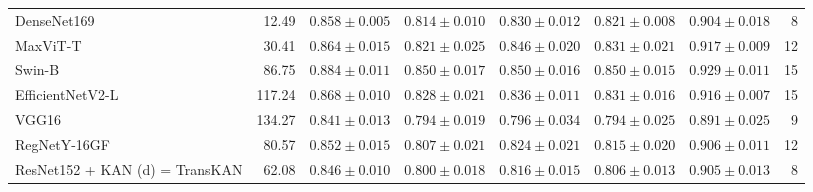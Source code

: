 \begin{table}[t]
\begin{tabular}{lrcccccr}
DenseNet169 & 12.49 & $0.858 \pm 0.005$ & $0.814 \pm 0.010$ & $0.830 \pm 0.012$ & $0.821 \pm 0.008$ & $0.904 \pm 0.018$ & 8 \\
MaxViT-T & 30.41 & $0.864 \pm 0.015$ & $0.821 \pm 0.025$ & $0.846 \pm 0.020$ & $0.831 \pm 0.021$ & $0.917 \pm 0.009$ & 12 \\
Swin-B & 86.75 & $0.884 \pm 0.011$ & $0.850 \pm 0.017$ & $0.850 \pm 0.016$ & $0.850 \pm 0.015$ & $0.929 \pm 0.011$ & 15 \\
EfficientNetV2-L & 117.24 & $0.868 \pm 0.010$ & $0.828 \pm 0.021$ & $0.836 \pm 0.011$ & $0.831 \pm 0.016$ & $0.916 \pm 0.007$ & 15 \\
VGG16 & 134.27 & $0.841 \pm 0.013$ & $0.794 \pm 0.019$ & $0.796 \pm 0.034$ & $0.794 \pm 0.025$ & $0.891 \pm 0.025$ & 9 \\
RegNetY-16GF & 80.57 & $0.852 \pm 0.015$ & $0.807 \pm 0.021$ & $0.824 \pm 0.021$ & $0.815 \pm 0.020$ & $0.906 \pm 0.011$ & 12 \\
ResNet152 + KAN (d) = TransKAN & 62.08 & $0.846 \pm 0.010$ & $0.800 \pm 0.018$ & $0.816 \pm 0.015$ & $0.806 \pm 0.013$ & $0.905 \pm 0.013$ & 8 \\
\hline
\end{tabular}
\end{table}
